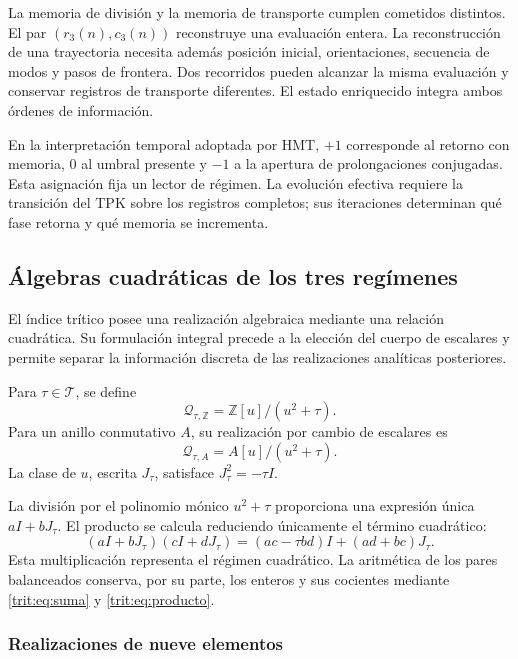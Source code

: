 La memoria de división y la memoria de transporte cumplen cometidos
distintos. El par \((r_3(n),c_3(n))\) reconstruye una evaluación entera.
La reconstrucción de una trayectoria necesita además posición inicial,
orientaciones, secuencia de modos y pasos de frontera. Dos recorridos
pueden alcanzar la misma evaluación y conservar registros de transporte
diferentes. El estado enriquecido integra ambos órdenes de información.

En la interpretación temporal adoptada por HMT, \(+1\) corresponde al
retorno con memoria, \(0\) al umbral presente y \(-1\) a la apertura de
prolongaciones conjugadas. Esta asignación fija un lector de régimen.
La evolución efectiva requiere la transición del TPK sobre los registros
completos; sus iteraciones determinan qué fase retorna y qué memoria se
incrementa.

\subsection{Álgebras cuadráticas de los tres regímenes}
\label{trit:cuadraticas}

El índice trítico posee una realización algebraica mediante una relación
cuadrática. Su formulación integral precede a la elección del cuerpo de
escalares y permite separar la información discreta de las realizaciones
analíticas posteriores.

\begin{definicion}
Para \(\tau\in\mathcal T\), se define
\[
 \mathcal Q_{\tau,\mathbb Z}=\mathbb Z[u]/(u^2+\tau).
\]
Para un anillo conmutativo \(A\), su realización por cambio de escalares es
\[
 \mathcal Q_{\tau,A}=A[u]/(u^2+\tau).
\]
La clase de \(u\), escrita \(J_\tau\), satisface
\(J_\tau^2=-\tau I\).
\end{definicion}

La división por el polinomio mónico \(u^2+\tau\) proporciona una expresión
única \(aI+bJ_\tau\). El producto se calcula reduciendo únicamente el
término cuadrático:
\begin{equation}
 (aI+bJ_\tau)(cI+dJ_\tau)
 =(ac-\tau bd)I+(ad+bc)J_\tau.
\label{trit:eq:producto-cuadratico}
\end{equation}
Esta multiplicación representa el régimen cuadrático. La aritmética de
los pares balanceados conserva, por su parte, los enteros y sus cocientes
mediante \eqref{trit:eq:suma} y \eqref{trit:eq:producto}.

\subsubsection{Realizaciones de nueve elementos}

